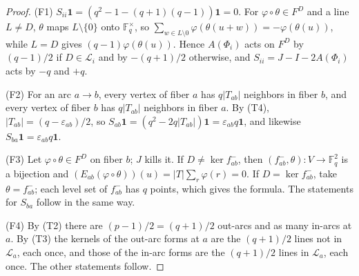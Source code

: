 \documentclass[11pt]{amsart}
\theoremstyle{definition}
\theoremstyle{remark}
\newcommand{\F}{\mathbb{F}}
\newcommand{\one}{\mathbf 1}
\begin{document}
\begin{proof}
(F1) $S_{ii}\one=(q^2-1-(q+1)(q-1))\one=0$. For $\varphi\circ\theta\in F^D$ and a line $L\ne D$, $\theta$ maps
$L\setminus\{0\}$ onto $\F_q^\times$, so $\sum_{w\in L\setminus0}\varphi(\theta(u+w))=-\varphi(\theta(u))$, while $L=D$ gives
$(q-1)\varphi(\theta(u))$. Hence $A(\Phi_i)$ acts on $F^D$ by $(q-1)/2$ if $D\in\mathcal L_i$ and by $-(q+1)/2$ otherwise,
and $S_{ii}=J-I-2A(\Phi_i)$ acts by $-q$ and $+q$.

(F2) For an arc $a\to b$, every vertex of fiber $a$ has $q|T_{ab}|$ neighbors in fiber $b$, and every vertex of fiber
$b$ has $q|T_{ab}|$ neighbors in fiber $a$. By (T4), $|T_{ab}|=(q-\varepsilon_{ab})/2$, so
$S_{ab}\one=(q^2-2q|T_{ab}|)\one=\varepsilon_{ab}q\one$, and likewise $S_{ba}\one=\varepsilon_{ab}q\one$.

(F3) Let $\varphi\circ\theta\in F^D$ on fiber $b$; $J$ kills it. If $D\ne\ker f^-_{ab}$, then
$(f^-_{ab},\theta)\colon V\to\F_q^2$ is a bijection and $(E_{ab}(\varphi\circ\theta))(u)=|T|\sum_r\varphi(r)=0$. If
$D=\ker f^-_{ab}$, take $\theta=f^-_{ab}$; each level set of $f^-_{ab}$ has $q$ points, which gives the formula. The
statements for $S_{ba}$ follow in the same way.

(F4) By (T2) there are $(p-1)/2=(q+1)/2$ out-arcs and as many in-arcs at $a$. By (T3) the kernels of the out-arc forms
at $a$ are the $(q+1)/2$ lines not in $\mathcal L_a$, each once, and those of the in-arc forms are the $(q+1)/2$ lines in
$\mathcal L_a$, each once. The other statements follow.
\end{proof}
\end{document}
